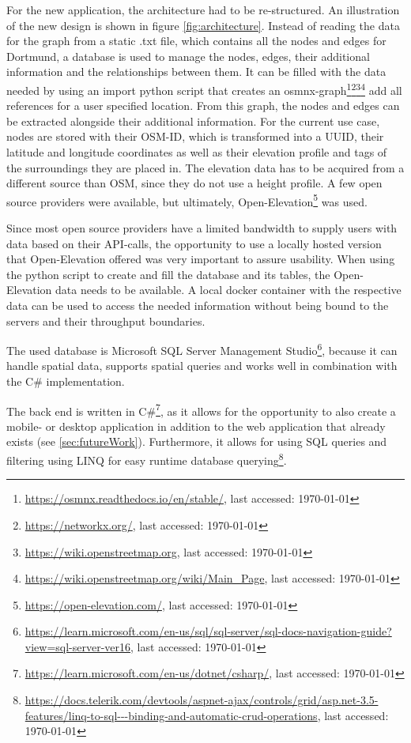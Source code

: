 For the new application, the architecture had to be re-structured.
An illustration of the new design is shown in figure \ref{fig:architecture}.
Instead of reading the data for the graph from a static .txt file, which contains all the nodes and edges for Dortmund, a database is used to manage the nodes, edges, their additional information and the relationships between them. 
It can be filled with the data needed by using an import python script that creates an osmnx-graph\footnote{\url{https://osmnx.readthedocs.io/en/stable/}, last accessed: \today}\footnote{\url{https://networkx.org/}, last accessed: \today}\footnote{\url{https://wiki.openstreetmap.org}, last accessed: \today}\footnote{\url{https://wiki.openstreetmap.org/wiki/Main_Page}, last accessed: \today} add all references for a user specified location. 
From this graph, the nodes and edges can be extracted alongside their additional information.
For the current use case, nodes are stored with their OSM-ID, which is transformed into a UUID, their latitude and longitude coordinates as well as their elevation profile and tags of the surroundings they are placed in.
The elevation data has to be acquired from a different source than OSM, since they do not use a height profile. 
A few open source providers were available, but ultimately, Open-Elevation\footnote{\url{https://open-elevation.com/}, last accessed: \today} was used. 

Since most open source providers have a limited bandwidth to supply users with data based on their API-calls, the opportunity to use a locally hosted version that Open-Elevation offered was very important to assure usability.
When using the python script to create and fill the database and its tables, the Open-Elevation data needs to be available.
A local docker container with the respective data can be used to access the needed information without being bound to the servers and their throughput boundaries.

The used database is Microsoft SQL Server Management Studio\footnote{\url{https://learn.microsoft.com/en-us/sql/sql-server/sql-docs-navigation-guide?view=sql-server-ver16}, last accessed: \today}, because it can handle spatial data, supports spatial queries and works well in combination with the C\# implementation.

The back end is written in C\#\footnote{\url{https://learn.microsoft.com/en-us/dotnet/csharp/}, last accessed: \today}, as it allows for the opportunity to also create a mobile- or desktop application in addition to the web application that already exists (see \ref{sec:futureWork}).
Furthermore, it allows for using SQL queries and filtering using LINQ for easy runtime database querying\footnote{\url{https://docs.telerik.com/devtools/aspnet-ajax/controls/grid/asp.net-3.5-features/linq-to-sql---binding-and-automatic-crud-operations}, last accessed: \today}.


